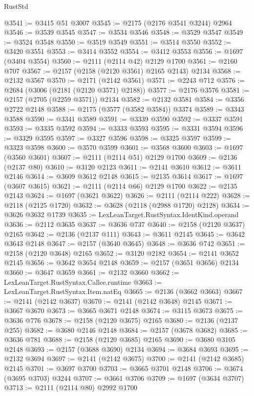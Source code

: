\begin{lexlean}{RustStd}
\begin{coremodule}
@3541 := @3415 @51 @3007
@3545 := @2175 (@2176 @3541 @3244) @2964
@3546 := @3539 @3545
@3547 := @3534 @3546
@3548 := @3529 @3547
@3549 := @3524 @3548
@3550 := @3519 @3549
@3551 := @3514 @3550
@3552 := @3420 @3551
@3553 := @3414 @3552
@3554 := @3412 @3553
@3556 := @1697 (@3404 @3554)
@3560 := @2111 (@2114 @42) @2129 @1700
@3561 := @2160 @707
@3567 := @2157 (@2158 (@2120 @3561) @2165 @2143) @2134
@3568 := @2132 @3567
@3570 := @2171 (@2142 @3561)
@3571 := @2243 @712
@3576 := @2684 (@3006 (@2181 (@2120 @3571) @2188))
@3577 := @2176 @3576
@3581 := @2157 (@2705 (@2259 @3571)) @2134
@3582 := @2132 @3581
@3584 := @3356 @2722 @2148
@3588 := @2175 (@3577 (@3582 @3584)) @3374
@3589 := @3343 @3588
@3590 := @3341 @3589
@3591 := @3339 @3590
@3592 := @3337 @3591
@3593 := @3335 @3592
@3594 := @3333 @3593
@3595 := @3331 @3594
@3596 := @3329 @3595
@3597 := @3327 @3596
@3598 := @3325 @3597
@3599 := @3323 @3598
@3600 := @3570 @3599
@3601 := @3568 @3600
@3603 := @1697 (@3560 @3601)
@3607 := @2111 (@2114 @51) @2129 @1700
@3609 := @2136 (@2137 @80)
@3610 := @3120 @2123
@3611 := @2141 @3610
@3612 := @3611 @2146
@3614 := @3609 @3612 @2148
@3615 := @2135 @3614
@3617 := @1697 (@3607 @3615)
@3621 := @2111 (@2114 @66) @2129 @1700
@3622 := @2135 @2143
@3624 := @1697 (@3621 @3622)
@3626 := @2111 (@2114 @222)
@3628 := @2118 (@2125 @1720)
@3632 := @3628 (@2118 (@2988 @1720) @2128)
@3634 := @3626 @3632 @1739
@3635 := LexLeanTarget.RustSyntax.IdentKind.operand
@3636 := @2112 @3635
@3637 := @3636 @737
@3640 := @2158 (@2120 @3637) @2165
@3642 := @2136 (@2137 @111)
@3643 := @3611 @2145
@3645 := @3642 @3643 @2148
@3647 := @2157 (@3640 @3645)
@3648 := @3636 @742
@3651 := @2158 (@2120 @3648) @2165
@3652 := @3120 @2182
@3654 := @2141 @3652 @2145
@3656 := @3642 @3654 @2148
@3659 := @2157 (@3651 @3656) @2134
@3660 := @3647 @3659
@3661 := @2132 @3660
@3662 := LexLeanTarget.RustSyntax.Callee.runtime
@3663 := LexLeanTarget.RustSyntax.Item.natEq
@3665 := @2136 (@3662 @3663)
@3667 := @2141 (@2142 @3637)
@3670 := @2141 (@2142 @3648) @2145
@3671 := @3667 @3670
@3673 := @3665 @3671 @2148
@3674 := @3115 @3673
@3675 := @3636 @776
@3678 := @2158 (@2120 @3675) @2165
@3680 := @2136 (@2137 @255)
@3682 := @3680 @2146 @2148
@3684 := @2157 (@3678 @3682)
@3685 := @3636 @781
@3688 := @2158 (@2120 @3685) @2165
@3690 := @3680 @3105 @2148
@3693 := @2157 (@3688 @3690) @2134
@3694 := @3684 @3693
@3695 := @2132 @3694
@3697 := @2141 (@2142 @3675)
@3700 := @2141 (@2142 @3685) @2145
@3701 := @3697 @3700
@3703 := @3665 @3701 @2148
@3706 := @3674 (@3695 @3703) @3244
@3707 := @3661 @3706
@3709 := @1697 (@3634 @3707)
@3713 := @2111 (@2114 @80) @2992 @1700

\end{coremodule}
\end{lexlean}
